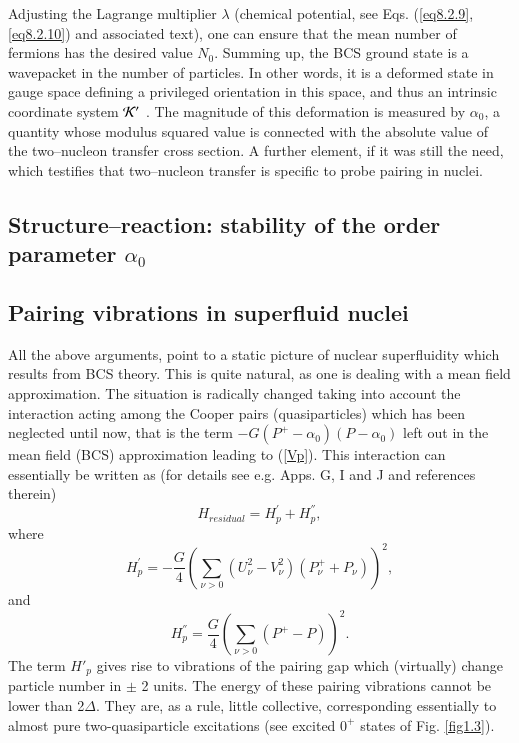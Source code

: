 Adjusting the Lagrange multiplier $\lambda$ (chemical potential, see Eqs. (\ref{eq8.2.9}, \ref{eq8.2.10}) and associated text), one can ensure that the mean number of fermions has the desired value $N_0$.
Summing up, the BCS ground state is a wavepacket in the number of particles. In other words, it is a deformed state in gauge space  defining a privileged 
orientation in this space, and thus an intrinsic coordinate system ${\cal K'}$ \citep{Anderson:58, Bohr:64,Bes:66}.
The magnitude of this deformation is measured by $\alpha_0$, a quantity whose modulus squared value is connected with the absolute value of the two--nucleon transfer cross section. A further element, if it was still the need, which testifies that two--nucleon transfer is specific to probe pairing in nuclei.
\subsection{Structure--reaction: stability of the order parameter $\alpha_0$}\label{C6S2.3}
\subsection{Pairing vibrations in superfluid nuclei}\label{C8S2.3}
All the above arguments, point to a static picture of nuclear superfluidity which results from BCS theory. This is quite 
natural, as one is dealing with a mean field approximation.
The situation is radically changed  taking into account the interaction 
acting among the Cooper pairs (quasiparticles) which has been neglected until now, that is the term
$- G (P^+ -\alpha_0)(P-\alpha_0)$ left out in the mean field (BCS) approximation leading to (\ref{Vp}).
This interaction can essentially be written as (for details see e.g. \cite{Brink:05} Apps. G, I and J and references therein)
\begin{equation}
H_{residual} = H^{'}_p + H^{''}_p,
\end{equation} 
where 
\begin{equation}
H^{'}_p = - \frac{G}{4} 
\left( \sum_{\nu>0} (U^2_{\nu} - V^2_{\nu})(P^+_{\nu} + P_{\nu}) \right)^2,
\end{equation}
and 
\begin{equation}
H_p^{''} = \frac{G}{4} \left( \sum_{\nu>0} (P^+ - P) \right)^2.
\end{equation}
The term $H'_p$ gives rise to vibrations of the pairing gap  which (virtually) change particle number in $\pm$ 2 units. The energy
of these pairing vibrations cannot be lower than 2$\Delta$. They are, as a rule, little collective, corresponding  essentially 
to almost pure two-quasiparticle excitations (see excited $0^+$ states of Fig. \ref{fig1.3}).

